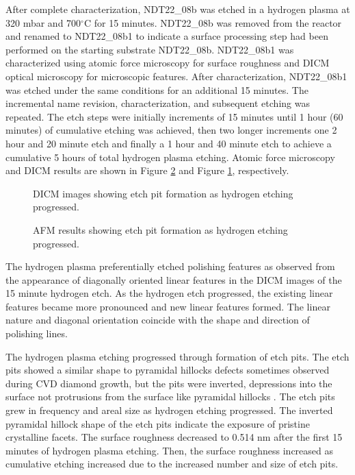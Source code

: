 After complete characterization, NDT22\_08b was etched in a hydrogen plasma at 320 mbar and 700$^\circ$C for 15 minutes. NDT22\_08b was removed from the reactor and renamed to NDT22\_08b1 to indicate a surface processing step had been performed on the starting substrate NDT22\_08b. NDT22\_08b1 was characterized using atomic force microscopy for surface roughness and DICM optical microscopy for microscopic features. After characterization, NDT22\_08b1 was etched under the same conditions for an additional 15 minutes. The incremental name revision, characterization, and subsequent etching was repeated. The etch steps were initially increments of 15 minutes until 1 hour (60 minutes) of cumulative etching was achieved, then two longer increments one 2 hour and 20 minute etch and finally a 1 hour and 40 minute etch to achieve a cumulative 5 hours of total hydrogen plasma etching. Atomic force microscopy and DICM results are shown in Figure \ref{fig:H2EtchAFM} and Figure \ref{fig:H2EtchDICM}, respectively.

\begin{figure}
    \centering
    
    \caption{DICM images showing etch pit formation as hydrogen etching progressed.}
    \label{fig:H2EtchDICM}
\end{figure}

\begin{figure}
    \centering
    
    \caption{AFM results showing etch pit formation as hydrogen etching progressed.}
    \label{fig:H2EtchAFM}
\end{figure}


The hydrogen plasma preferentially etched polishing features as observed from the appearance of diagonally oriented linear features in the DICM images of the 15 minute hydrogen etch. As the hydrogen etch progressed, the existing linear features became more pronounced and new linear features formed. The linear nature and diagonal orientation coincide with the shape and direction of polishing lines.

The hydrogen plasma etching progressed through formation of etch pits. The etch pits showed a similar shape to pyramidal hillocks defects sometimes observed during CVD diamond growth, but the pits were inverted, depressions into the surface not protrusions from the surface like pyramidal hillocks \cite{Lee1997AFilms}. The etch pits grew in frequency and areal size as hydrogen etching progressed. The inverted pyramidal hillock shape of the etch pits indicate the exposure of pristine crystalline facets. The surface roughness decreased to 0.514 nm after the first 15 minutes of hydrogen plasma etching. Then, the surface roughness increased as cumulative etching increased due to the increased number and size of etch pits.

